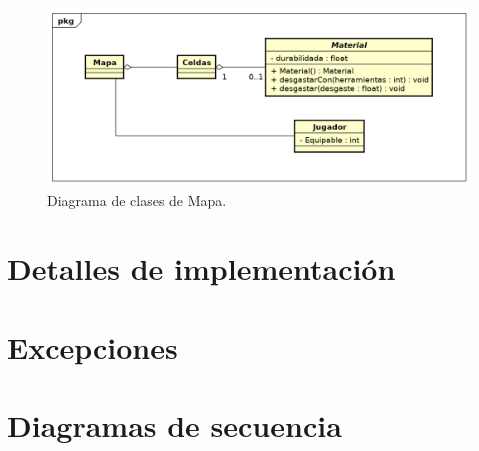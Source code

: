 \documentclass[titlepage,a4paper]{article}
\begin{document}
\begin{figure}[H]
\centering
\includegraphics[width=\textwidth]{Diagramas/Mapa.png}
\caption{\label{fig:mapa}Diagrama de clases de Mapa.}
\end{figure}

\section{Detalles de implementación}\label{sec:implementacion}

\section{Excepciones}\label{sec:excepciones}

\section{Diagramas de secuencia}\label{sec:diagramasdesecuencia}
\end{document}
